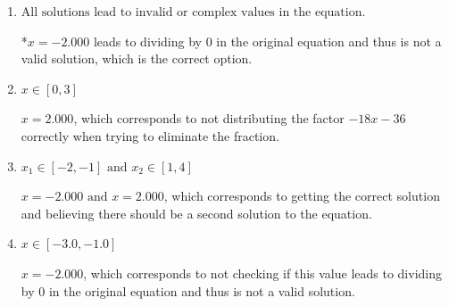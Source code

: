 \documentclass{extbook}[14pt]
\begin{document}
\begin{enumerate}
{\begin{enumerate}[label=\Alph*.]
$x = -2.000 \text{ and } x = -2.000$, which corresponds to getting the correct solution and believing there should be a second solution to the equation.
\item \( \text{All solutions lead to invalid or complex values in the equation.} \)

*$x = -2.000$ leads to dividing by 0 in the original equation and thus is not a valid solution, which is the correct option.
\item \( x \in [0,3] \)

$x = 2.000$, which corresponds to not distributing the factor $-18x -36$ correctly when trying to eliminate the fraction.
\item \( x_1 \in [-2, -1] \text{ and } x_2 \in [1,4] \)

$x = -2.000 \text{ and } x = 2.000$, which corresponds to getting the correct solution and believing there should be a second solution to the equation.
\item \( x \in [-3.0,-1.0] \)

$x = -2.000$, which corresponds to not checking if this value leads to dividing by 0 in the original equation and thus is not a valid solution.
\end{enumerate}

}
\end{enumerate}
\end{document}
